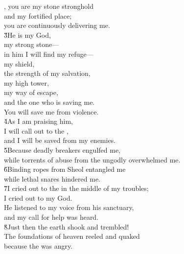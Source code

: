 \begin{poetry}
\poeml {}, you are my stone stronghold \\
\poemll    and my fortified place; \\
\poemlll       you are continuously delivering me. \\
\poeml \v{3}He is my God, \\
\poemll    my strong stone--- \\
\poemlll       in him I will find my refuge--- \\
\poeml my shield, \\
\poemll    the strength of my salvation, \\
\poemlll       my high tower, \\
\poeml my way of escape, \\
\poemll    and the one who is saving me. \\
\poemlll       You will save me from violence. \\
\poeml \v{4}As I am praising him, \\
\poemll    I will call out to the , \\
\poemlll       and I will be saved from my enemies. \\
\poeml \v{5}Because deadly breakers engulfed me, \\
\poemll    while torrents of abuse from the ungodly overwhelmed me. \\
\poeml \v{6}Binding ropes from Sheol entangled me \\
\poemll    while lethal snares hindered me. \\
\poeml \v{7}I cried out to the  in the middle of my troubles; \\
\poemll    I cried out to my God. \\
\poeml He listened to my voice from his sanctuary, \\
\poemll    and my call for help was heard. \\
\poeml \v{8}Just then the earth shook and trembled! \\
\poemll    The foundations of heaven reeled and quaked \\
\poemlll       because the  was angry. \\

\end{poetry}
